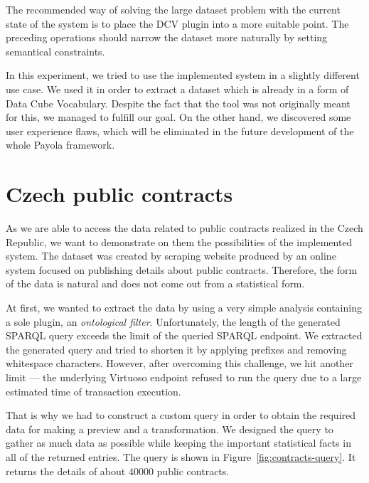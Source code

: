 The recommended way of solving the large dataset problem with the current state of the system
is to place the DCV 
plugin into a more suitable point. The preceding operations should narrow the 
dataset more naturally by setting semantical constraints.

In this experiment, we tried to use the implemented system in a slightly 
different use case. We used it in order to extract a dataset which is already in 
a form of Data Cube Vocabulary. Despite the fact that the tool was not 
originally meant for this, we managed to fulfill our goal. On the other hand, 
we discovered some user experience flaws, which will be eliminated in the future 
development of the whole Payola framework.

\section{Czech public contracts}
As we are able to access the data related to public contracts realized in the 
Czech Republic, we want to demonstrate on them the possibilities of the implemented system.
The dataset was created by scraping website produced by an online system focused 
on publishing details about public contracts. Therefore, the form of the data is 
natural and does not come out from a statistical form.

At first, we wanted to extract the data by using a very simple analysis
containing a sole plugin, an \emph{ontological filter}. Unfortunately, the length
of the generated SPARQL query exceeds the limit of the queried SPARQL endpoint.
We extracted the generated query and tried to shorten it by applying prefixes 
and removing whitespace characters. However, after overcoming this challenge, we 
hit another limit --- the underlying Virtuoso endpoint refused to run the query 
due to a large estimated time of transaction execution.

That is why we had to construct a custom query in order to obtain the required 
data for making a preview and a transformation. We designed the query to 
gather as much data as possible while keeping the important statistical facts in 
all of the returned entries. The query is shown in 
Figure~\ref{fig:contracts-query}. It returns the details of about $40000$ public 
contracts.

